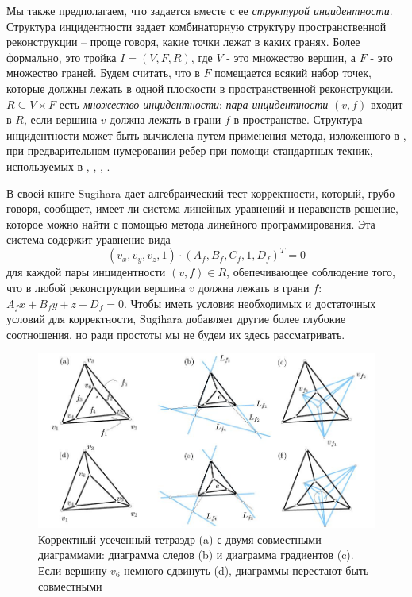 \documentclass[a4paper,12pt, titlepage]{article}
\begin{document}
\begin{flushleft}
	Мы также предполагаем, что задается вместе с ее \textit{структурой инцидентности}. Структура инцидентности
задает комбинаторную структуру пространственной реконструкции -- проще говоря, какие точки лежат в каких гранях.
Более формально, это тройка $I = (V, F, R)$, где $V$ - это множество вершин, а $F$ - это множество граней. Будем 
считать, что в $F$ помещается всякий набор точек, которые должны лежать в одной плоскости в пространственной 
реконструкции. $R \subseteq V \times F$ есть \textit{множество инцидентности}: \textit{пара инцидентности} $(v, f)$
входит в $R$, если вершина $v$ должна лежать в грани $f$ в пространстве. Структура инцидентности 
может быть вычислена путем применения метода, изложенного в \cite{Sugihara-MILD}, при предварительном
нумеровании ребер при помощи стандартных техник, используемых в \cite{Huffmann}, 
\cite{Waltz}, \cite{Parodi-Torre}, 
\cite{Parodi-Lancewicki-Vijh}.
\end{flushleft}

\begin{flushleft}
	В своей книге \cite{Sugihara-MILD} Sugihara дает алгебраический тест корректности,
 который, грубо говоря, сообщает, имеет ли система линейных уравнений и неравенств решение, 
которое можно найти с помощью метода линейного программирования. Эта система содержит 
уравнение вида 
\begin{equation}
 (v_{x}, v_{y}, v_{z}, 1) \cdotp (A_{f}, B_{f}, C_{f}, 1, D_{f})^{T} = 0
\label{equation-Sugihara}
\end{equation}
для каждой пары инцидентности $(v, f) \in R$, обепечивающее соблюдение того, что в любой
реконструкции вершина $v$ должна лежать в грани $f$: $A_{f}x + B_{f}y + z + D_{f} = 0$.
Чтобы иметь условия необходимых и достаточных условий для корректности, Sugihara 
добавляет другие более глубокие соотношения, но ради простоты мы не будем их здесь рассматривать.
\end{flushleft}

\begin{flushleft}
	\begin{figure}[thb]
	    \includegraphics[width=15cm]{img/ros-thomas-tetrahedron.jpeg}
	    \caption{Корректный усеченный тетраэдр (a) с двумя совместными диаграммами:
	    диаграмма следов (b) и диаграмма градиентов (c). Если вершину $v_{6}$ немного
	    сдвинуть (d), диаграммы перестают быть совместными}
	    \label{tetrahedron}
	\end{figure}
\end{flushleft}
\end{document}
